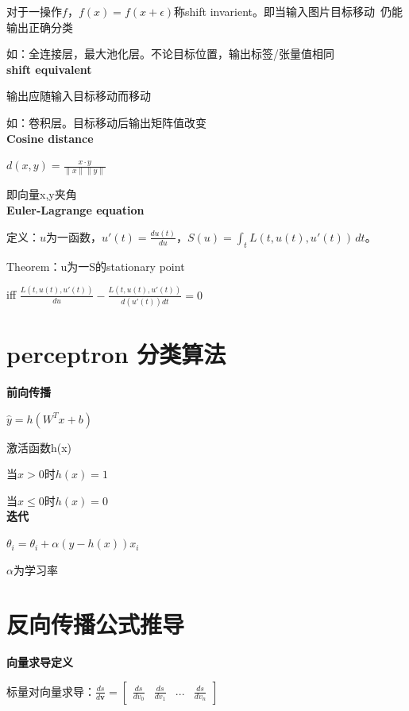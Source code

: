 \documentclass[UTF8]{ctexart}
\begin{document}
  对于一操作$f$，$f(x) = f(x + \epsilon)$称shift invarient。即当输入图片目标移动\ 仍能输出正确分类
  
  如：全连接层，最大池化层。不论目标位置，输出标签/张量值相同\\
\textbf{shift equivalent}

  输出应随输入目标移动而移动

  如：卷积层。目标移动后输出矩阵值改变\\
\textbf{Cosine distance}

  $d(x, y) = \frac{x \cdot y}{\|x\|\|y\|}$

  即向量x,y夹角\\
\textbf{Euler-Lagrange equation}

  定义：$u$为一函数，$u'(t) = \frac{du(t)}{du}$，$S(u)= \int_{t} L(t, u(t), u'(t)) \,dt$。

  Theorem：u为一S的stationary point
  
  \quad iff $\frac{L(t, u(t), u'(t))}{du} - \frac{L(t, u(t), u'(t))}{d(u'(t))dt} = 0$

\section{perceptron 分类算法}
\noindent \textbf{前向传播}

  $\hat{y} = h(W^Tx + b)$
  
  激活函数h(x)

  \quad 当$x > 0$时$h(x) = 1$

  \quad 当$x \leq 0$时$h(x) = 0$\\
\textbf{迭代}

  $\theta_i = \theta_i + \alpha(y - h(x))x_i$
  
  \quad $\alpha$为学习率

\section{反向传播公式推导}
\noindent \textbf{向量求导定义}

  标量对向量求导：$\frac{ds}{d\textbf{v}} = \begin{bmatrix}
    \frac{ds}{dv_0} & \frac{ds}{dv_1} & ... & \frac{ds}{dv_n}
    \end{bmatrix}$
\end{document}
